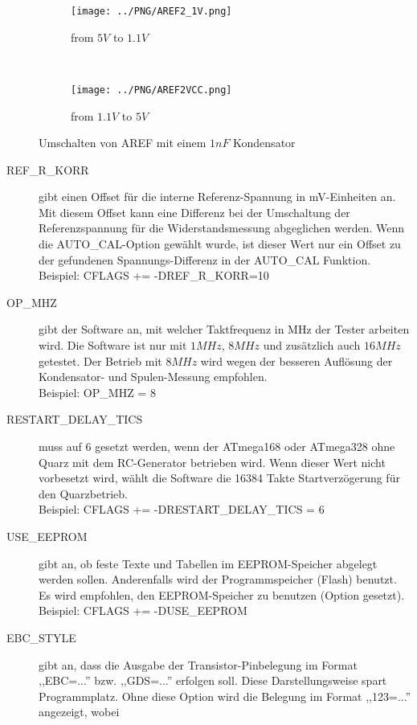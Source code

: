 \begin{figure}[H]
  \begin{subfigure}[b]{8.6cm}
    \centering
    \texttt{[image: ../PNG/AREF2\_1V.png]}
    \caption{from \(5V\) to \(1.1V\) }
    \label{pic:aref1}
  \end{subfigure}
  ~
  \begin{subfigure}[b]{8.6cm}
    \centering
    \texttt{[image: ../PNG/AREF2VCC.png]}
    \caption{from \(1.1V\) to \(5V\)}
    \label{pic:aref5}
  \end{subfigure}
  \caption{Umschalten von AREF mit einem \(1nF\) Kondensator}
\end{figure}

\begin{description}
  \item[REF\_R\_KORR] gibt einen Offset für die interne Referenz-Spannung in mV-Einheiten an.
Mit diesem Offset kann eine Differenz bei der Umschaltung der Referenzspannung für die Widerstandsmessung abgeglichen werden.
Wenn die AUTO\_CAL-Option gewählt wurde, ist dieser Wert nur ein Offset zu der gefundenen Spannungs-Differenz in der
AUTO\_CAL Funktion.\\
Beispiel: CFLAGS += -DREF\_R\_KORR=10
  \item[OP\_MHZ] gibt der Software an, mit welcher Taktfrequenz in MHz der Tester arbeiten wird.
Die Software ist nur mit \(1MHz\), \(8MHz\) und zusätzlich auch \(16MHz\) getestet. Der Betrieb mit \(8MHz\) wird wegen der besseren Auflösung der
Kondensator- und Spulen-Messung empfohlen.\\
Beispiel: OP\_MHZ = 8
  \item[RESTART\_DELAY\_TICS] muss auf 6 gesetzt werden, wenn der ATmega168 oder ATmega328 ohne Quarz mit dem
RC-Generator betrieben wird. Wenn dieser Wert nicht vorbesetzt wird, wählt die Software die 16384 Takte Startverzögerung für
den Quarzbetrieb.\\
Beispiel: CFLAGS += -DRESTART\_DELAY\_TICS = 6
  \item[USE\_EEPROM] gibt an, ob feste Texte und Tabellen im EEPROM-Speicher abgelegt werden sollen.
Anderenfalls wird der Programmspeicher (Flash) benutzt.
Es wird empfohlen, den EEPROM-Speicher zu benutzen (Option gesetzt).\\
Beispiel: CFLAGS += -DUSE\_EEPROM
  \item[EBC\_STYLE] gibt an, dass die Ausgabe der Transistor-Pinbelegung im Format ,,EBC=...'' bzw. ,,GDS=...'' erfolgen soll.
Diese Darstellungsweise spart Programmplatz. Ohne diese Option wird die Belegung im Format ,,123=...'' angezeigt, wobei

\end{description}
